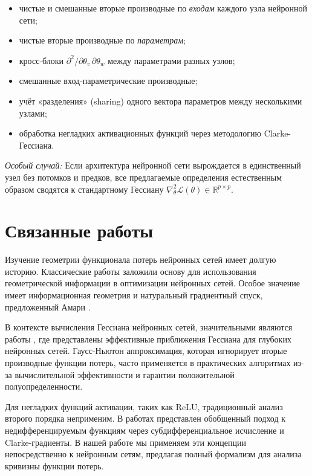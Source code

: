 \documentclass[11pt]{article}
\begin{document}
\begin{itemize}
  \item чистые и смешанные вторые производные по \emph{входам} каждого узла нейронной сети;
  \item чистые вторые производные по \emph{параметрам};
  \item кросс-блоки $\partial^2/\partial\theta_v\,\partial\theta_w$ между параметрами разных узлов;
  \item смешанные вход-параметрические производные;
  \item учёт «разделения» (sharing) одного вектора параметров между несколькими узлами;
  \item обработка негладких активационных функций через методологию Clarke-Гессиана.
\end{itemize}

\emph{Особый случай:} Если архитектура нейронной сети вырождается в единственный узел без потомков и предков,
все предлагаемые определения естественным образом сводятся к стандартному Гессиану $\nabla^2_\theta\mathcal
L(\theta)\in\mathbb{R}^{p\times p}$.

\section{Связанные работы}

Изучение геометрии функционала потерь нейронных сетей имеет долгую историю. Классические работы
\citep{amari1998natural, heskes2000natural} заложили основу для использования геометрической информации в
оптимизации нейронных сетей. Особое значение имеет информационная геометрия и натуральный градиентный спуск,
предложенный Амари \citep{amari1998natural}.

В контексте вычисления Гессиана нейронных сетей, значительными являются работы \citep{martens2010deep,
martens2012training}, где представлены эффективные приближения Гессиана для глубоких нейронных сетей.
Гаусс-Ньютон аппроксимация, которая игнорирует вторые производные функции потерь, часто применяется в
практических алгоритмах из-за вычислительной эффективности и гарантии положительной полуопределенности.

Для негладких функций активации, таких как ReLU, традиционный анализ второго порядка неприменим. В работах
\citep{clarke1990optimization, bolte2020conservative} представлен обобщенный подход к недифференцируемым
функциям через субдифференциальное исчисление и Clarke-градиенты. В нашей работе мы применяем эти концепции
непосредственно к нейронным сетям, предлагая полный формализм для анализа кривизны функции потерь.
\end{document}

